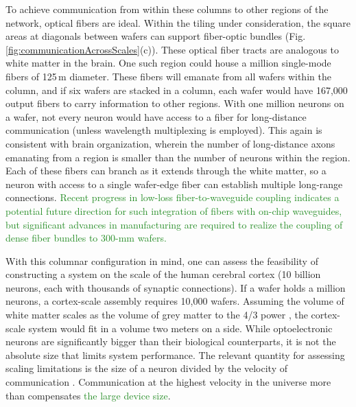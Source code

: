 \documentclass[twocolumn]{article}
\begin{document}
To achieve communication from within these columns to other regions of the network, optical fibers are ideal. Within the tiling under consideration, the square areas at diagonals between wafers can support fiber-optic bundles (Fig.\,\ref{fig:communicationAcrossScales}(c)). These optical fiber tracts are analogous to white matter in the brain. One such region could house a million single-mode fibers of 125\,\textmu m diameter. These fibers will emanate from all wafers within the column, and if six wafers are stacked in a column, each wafer would have 167,000 output fibers to carry information to other regions. With one million neurons on a wafer, not every neuron would have access to a fiber for long-distance communication (unless wavelength multiplexing is employed). This again is consistent with brain organization, wherein the number of long-distance axons emanating from a region is smaller than the number of neurons within the region. Each of these fibers can branch as it extends through the white matter, so a neuron with access to a single wafer-edge fiber can establish multiple long-range connections. \textcolor{ForestGreen}{Recent progress in low-loss fiber-to-waveguide coupling \cite{khbu2020} indicates a potential future direction for such integration of fibers with on-chip waveguides, but significant advances in manufacturing are required to realize the coupling of dense fiber bundles to 300-mm wafers.}

With this columnar configuration in mind, one can assess the feasibility of constructing a system on the scale of the human cerebral cortex (10 billion neurons, each with thousands of synaptic connections). If a wafer holds a million neurons, a cortex-scale assembly requires 10,000 wafers. Assuming the volume of white matter scales as the volume of grey matter to the 4/3 power \cite{zhse2000}, the cortex-scale system would fit in a volume two meters on a side. While optoelectronic neurons are significantly bigger than their biological counterparts, it is not the absolute size that limits system performance. The relevant quantity for assessing scaling limitations is the size of a neuron divided by the velocity of communication \cite{sh2019}. Communication at the highest velocity in the universe more than compensates \textcolor{ForestGreen}{the large device size}. 
\end{document}
